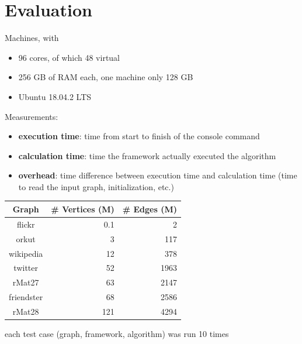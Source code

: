 \documentclass{meetings}
\begin{document}
\section{Evaluation}
\begin{multicols}{2}
 Machines, with
\begin{itemize}
	\item 96 cores, of which 48 virtual
	\item 256 GB of RAM each, one machine only 128 GB
	\item Ubuntu 18.04.2 LTS
\end{itemize}
\noindent Measurements:
\begin{itemize}
	\item \textbf{execution time}: time from start to finish of the console command
	\item \textbf{calculation time}: time the framework actually executed the algorithm
	\item \textbf{overhead}: time difference between execution time and calculation time \newline (time to read the input graph, initialization, etc.)
\end{itemize}

\columnbreak

\begin{center}
	\renewcommand{\arraystretch}{1.2}%
	\begin{tabular}{crr}
		\hline
		\bf{Graph}&\# Vertices (M)&\# Edges (M)\\\hline
		flickr&    		0.1&  2\\
		orkut&          3&    117\\
		wikipedia&      12&   378\\
		twitter&     	52&   1963\\
		rMat27&         63&   2147\\
		friendster&     68&   2586\\
		rMat28&         121&  4294\\
		\hline
	\end{tabular}
\end{center}


each test case (graph, framework, algorithm) was run 10 times
\end{multicols}
\end{document}
